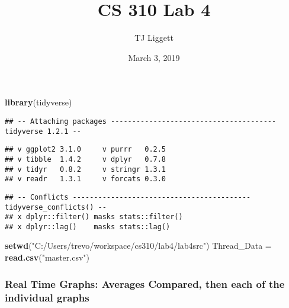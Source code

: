\documentclass[]{article}
\title{CS 310 Lab 4}
\author{TJ Liggett}
\date{March 3, 2019}
\newenvironment{Shaded}{\begin{snugshade}}{\end{snugshade}}
\newcommand{\KeywordTok}[1]{\textcolor[rgb]{0.13,0.29,0.53}{\textbf{#1}}}
\newcommand{\StringTok}[1]{\textcolor[rgb]{0.31,0.60,0.02}{#1}}
\newcommand{\NormalTok}[1]{#1}
\begin{document}
\maketitle

\begin{Shaded}
\begin{Highlighting}[]
\KeywordTok{library}\NormalTok{(tidyverse)}
\end{Highlighting}
\end{Shaded}

\begin{verbatim}
## -- Attaching packages --------------------------------------- tidyverse 1.2.1 --
\end{verbatim}

\begin{verbatim}
## v ggplot2 3.1.0     v purrr   0.2.5
## v tibble  1.4.2     v dplyr   0.7.8
## v tidyr   0.8.2     v stringr 1.3.1
## v readr   1.3.1     v forcats 0.3.0
\end{verbatim}

\begin{verbatim}
## -- Conflicts ------------------------------------------ tidyverse_conflicts() --
## x dplyr::filter() masks stats::filter()
## x dplyr::lag()    masks stats::lag()
\end{verbatim}

\begin{Shaded}
\begin{Highlighting}[]
\KeywordTok{setwd}\NormalTok{(}\StringTok{"C:/Users/trevo/workspace/cs310/lab4/lab4src"}\NormalTok{)}
\NormalTok{Thread_Data =}\StringTok{ }\KeywordTok{read.csv}\NormalTok{(}\StringTok{"master.csv"}\NormalTok{)}
\end{Highlighting}
\end{Shaded}

\subsubsection{Real Time Graphs: Averages Compared, then each of the
individual
graphs}\label{real-time-graphs-averages-compared-then-each-of-the-individual-graphs}
\end{document}
